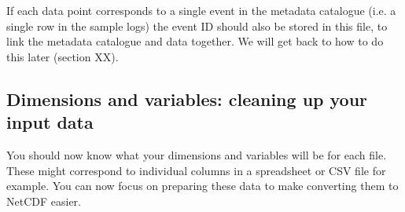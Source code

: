\documentclass[a4paper,english, 11pt]{article}
\begin{document}
If each data point corresponds to a single event in the metadata catalogue (i.e. a single row in the sample logs) the event ID should also be stored in this file, to link the metadata catalogue and data together. We will get back to how to do this later (section XX).

\subsection{Dimensions and variables: cleaning up your input data}
\label{ss:dimensionsvariables}

You should now know what your dimensions and variables will be for each file. These might correspond to individual columns in a spreadsheet or CSV file for example. You can now focus on preparing these data to make converting them to NetCDF easier.
\end{document}
